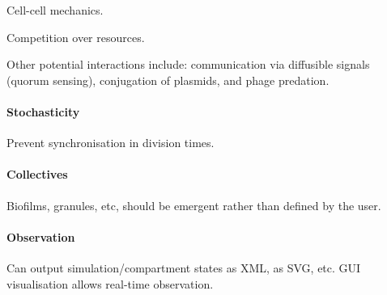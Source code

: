 \documentclass[10pt,letterpaper]{article}
\begin{document}
Cell-cell mechanics.

Competition over resources.

Other potential interactions include: communication via diffusible signals (quorum sensing), conjugation of plasmids, and phage predation.

\paragraph{Stochasticity}

Prevent synchronisation in division times.

\paragraph{Collectives}

Biofilms, granules, etc, should be emergent rather than defined by the user.

\paragraph{Observation}

Can output simulation/compartment states as XML, as SVG, etc. GUI visualisation allows real-time observation.
\end{document}
